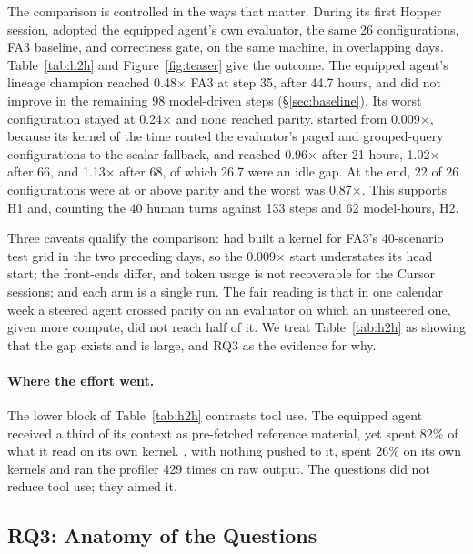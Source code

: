 The comparison is controlled in the ways that matter. During its first Hopper session, \sys adopted
the equipped agent's own evaluator, the same 26 configurations, FA3 baseline, and correctness gate,
on the same machine, in overlapping days. Table~\ref{tab:h2h} and Figure~\ref{fig:teaser} give the
outcome. The equipped agent's lineage champion reached 0.48$\times$ FA3 at step 35, after 44.7
hours, and did not improve in the remaining 98 model-driven steps (\S\ref{sec:baseline}). Its worst
configuration stayed at 0.24$\times$ and none reached parity. \sys started from 0.009$\times$,
because its kernel of the time routed the evaluator's paged and grouped-query configurations to the
scalar fallback, and reached 0.96$\times$ after 21 hours, 1.02$\times$ after 66, and 1.13$\times$
after 68, of which 26.7 were an idle gap. At the end, 22 of 26 configurations were at or above parity
and the worst was 0.87$\times$. This supports H1 and, counting the 40 human turns against 133 steps
and 62 model-hours, H2.

Three caveats qualify the comparison: \sys had built a kernel for FA3's 40-scenario test grid in
the two preceding days, so the 0.009$\times$ start understates its head start; the front-ends
differ, and token usage is not recoverable for the Cursor sessions; and each arm is a single run.
The fair reading is that in one calendar week a steered agent crossed parity on an evaluator on
which an unsteered one, given more compute, did not reach half of it. We treat Table~\ref{tab:h2h}
as showing that the gap exists and is large, and RQ3 as the evidence for why.

\paragraph{Where the effort went.} The lower block of Table~\ref{tab:h2h} contrasts tool use. The
equipped agent received a third of its context as pre-fetched reference material, yet spent 82\% of
what it read on its own kernel. \sys, with nothing pushed to it, spent 26\% on its own kernels and
ran the profiler 429 times on raw output. The questions did not reduce tool use; they aimed it.

\subsection{RQ3: Anatomy of the Questions}
\label{sec:eval-cases}

